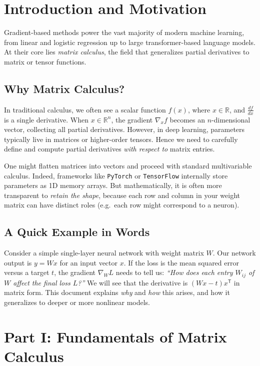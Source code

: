 \documentclass[11pt]{article}
\newcommand{\R}{\mathbb{R}}
\begin{document}
\section{Introduction and Motivation}
Gradient-based methods power the vast majority of modern machine learning, 
from linear and logistic regression up to large transformer-based language models. 
At their core lies \emph{matrix calculus}, 
the field that generalizes partial derivatives to matrix or tensor functions.

\subsection{Why Matrix Calculus?}
In traditional calculus, we often see a scalar function $f(x)$, 
where $x \in \R$, and $\frac{df}{dx}$ is a single derivative. 
When $x \in \R^n$, the gradient $\nabla_x f$ becomes an $n$-dimensional vector, 
collecting all partial derivatives. 
However, in deep learning, parameters typically live in matrices or higher-order tensors. 
Hence we need to carefully define and compute partial derivatives \emph{with respect to} matrix entries.

One might flatten matrices into vectors and proceed with standard multivariable calculus. 
Indeed, frameworks like \texttt{PyTorch} or \texttt{TensorFlow} internally store parameters 
as 1D memory arrays. But mathematically, it is often more transparent to \emph{retain the shape}, 
because each row and column in your weight matrix can have distinct roles (e.g.\ each row might correspond to a neuron).

\subsection{A Quick Example in Words}
Consider a simple single-layer neural network with weight matrix $W$. 
Our network output is $y = W x$ for an input vector $x$. 
If the loss is the mean squared error versus a target $t$, 
the gradient $\nabla_W L$ needs to tell us:
\emph{“How does each entry $W_{ij}$ of $W$ affect the final loss $L$?”}
We will see that the derivative is $(Wx - t) x^\mathsf{T}$ in matrix form. 
This document explains \emph{why} and \emph{how} this arises, 
and how it generalizes to deeper or more nonlinear models.

\section{Part I: Fundamentals of Matrix Calculus}
\label{sec:fundamentals}
\end{document}
